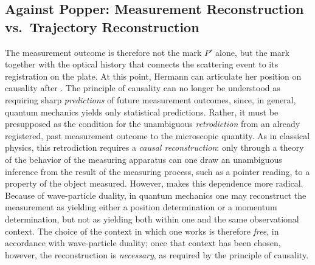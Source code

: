 \documentclass[final,12pt]{article}
\begin{document}
\subsection{Against Popper: Measurement Reconstruction vs.\ Trajectory 
Reconstruction}
%
The measurement outcome is therefore not the mark $P'$ alone, but the mark together with the optical history that connects the scattering event to its registration on the plate. At this point, Hermann can articulate her position on causality after \qm. The principle of causality can no longer be understood as requiring sharp \emph{predictions} of future measurement outcomes, since, in general, quantum mechanics yields only statistical predictions. Rather, it must be presupposed as the condition for the unambiguous \emph{retrodiction} from an already registered, past measurement outcome to the microscopic quantity. As in classical physics, this retrodiction requires a \emph{causal reconstruction}: only through a theory of the behavior of the measuring apparatus can one draw an unambiguous inference from the result of the measuring process, such as a pointer reading, to a property of the object measured. However, \qm makes this dependence more radical. Because of wave-particle duality, in quantum mechanics one may reconstruct the measurement as yielding either a position determination or a momentum determination, but not as yielding both within one and the same observational context. The choice of the context in which one works is therefore \emph{free}, in accordance with wave-particle duality; once that context has been chosen, however, the reconstruction is \emph{necessary}, as required by the principle of causality. 

\end{document}
